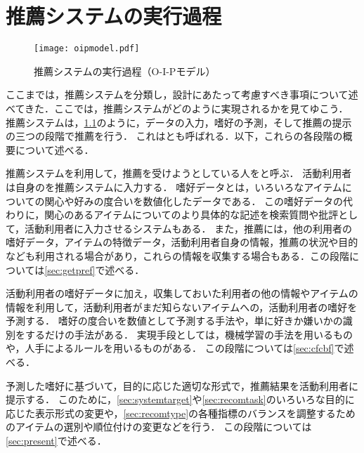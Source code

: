 \chapter{推薦システムの実行過程}
\label{sec:cfscheme}

\begin{figure}
\centering
\texttt{[image: oipmodel.pdf]}
\caption{推薦システムの実行過程（O-I-Pモデル）}
\label{fig:cfscheme}
\end{figure}

ここまでは，推薦システムを分類し，設計にあたって考慮すべき事項について述べてきた．ここでは，推薦システムがどのように実現されるかを見てゆこう．
推薦システムは，\ref{fig:cfscheme}のように，データの入力，嗜好の予測，そして推薦の提示の三つの段階で推薦を行う．
これは\cite{sigchi:03:01}とも呼ばれる．以下，これらの各段階の概要について述べる．

\begin{description}[style=nextline]
\item[データの入力]
推薦システムを利用して，推薦を受けようとしている人をと呼ぶ．
活動利用者は自身のを推薦システムに入力する．
嗜好データとは，いろいろなアイテムについての関心や好みの度合いを数値化したデータである．
この嗜好データの代わりに，関心のあるアイテムについてのより具体的な記述を検索質問や批評として，活動利用者に入力させるシステムもある．
また，推薦には，他の利用者の嗜好データ，アイテムの特徴データ，活動利用者自身の情報，推薦の状況や目的なども利用される場合があり，これらの情報を収集する場合もある．この段階については\ref{sec:getpref}で述べる．
\item[嗜好の予測]
活動利用者の嗜好データに加え，収集しておいた利用者の他の情報やアイテムの情報を利用して，活動利用者がまだ知らないアイテムへの，活動利用者の嗜好を予測する．
嗜好の度合いを数値として予測する手法や，単に好きか嫌いかの識別をするだけの手法がある．
実現手段としては，機械学習の手法を用いるものや，人手によるルールを用いるものがある．
この段階については\ref{sec:cfcbf}で述べる．
\item[推薦の提示]
予測した嗜好に基づいて，目的に応じた適切な形式で，推薦結果を活動利用者に提示する．
このために，\ref{sec:systemtarget}や\ref{sec:recomtask}のいろいろな目的に応じた表示形式の変更や，\ref{sec:recomtype}の各種指標のバランスを調整するためのアイテムの選別や順位付けの変更などを行う．
この段階については\ref{sec:present}で述べる．
\end{description}
